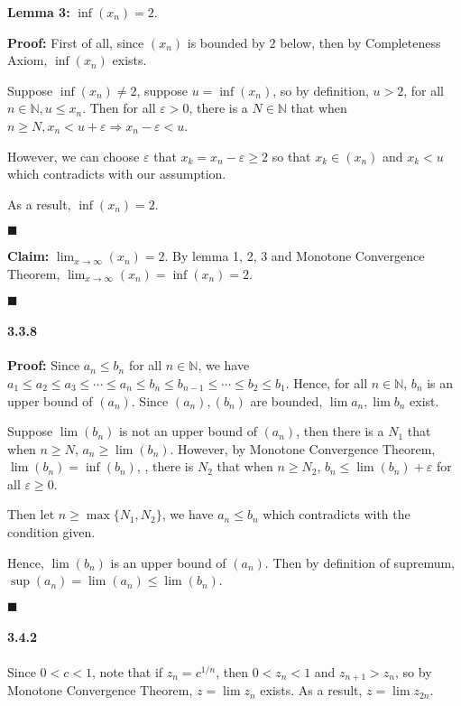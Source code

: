 \documentclass[11pt]{article}
\newcommand{\qed}{\begin{flushright}
					$\blacksquare$
				  \end{flushright}}
\begin{document}
		\textbf{Lemma 3:} $\inf(x_n) = 2$.
		
		\textbf{Proof:} First of all, since $(x_n)$ is bounded by $2$ below, then by Completeness Axiom, $\inf(x_n)$ exists.
		
		Suppose $\inf(x_n) \neq 2$, suppose $u = \inf(x_n)$, so by definition, $u > 2$, for all $n \in \mathbb{N}, u \leq x_n$. Then for all $\varepsilon > 0$, there is a $N \in \mathbb{N}$ that when $n \geq N, x_n < u + \varepsilon \Rightarrow x_n - \varepsilon < u$.
		
		However, we can choose $\varepsilon$ that $x_k = x_n - \varepsilon \geq 2$ so that $x_k \in (x_n)$ and $x_k < u$ which contradicts with our assumption.
		
		As a result, $\inf(x_n) = 2$.
		\qed
		
		\textbf{Claim:} $\lim_{x \rightarrow \infty} (x_n) = 2$.
		By lemma 1, 2, 3 and Monotone Convergence Theorem, $\lim_{x \rightarrow \infty} (x_n) = \inf(x_n) = 2$.
			\qed 
		
		
	\paragraph{3.3.8}\textbf{Proof:}
		Since $a_n \leq b_n$ for all $n \in \mathbb{N}$, we have $a_1 \leq a_2 \leq a_3 \leq \cdots \leq a_n \leq b_n \leq b_{n - 1} \leq \cdots \leq b_2 \leq b_1$. Hence, for all $n \in \mathbb{N}$, $b_n$ is an upper bound of $(a_n)$. Since $(a_n), (b_n)$ are bounded, $\lim a_n, \lim b_n$ exist.
		
		Suppose $\lim (b_n)$ is not an upper bound of $(a_n)$, then there is a $N_1$ that when $n \geq N$, $a_n \geq \lim (b_n)$. However, by Monotone Convergence Theorem, $\lim (b_n) = \inf(b_n)$, , there is $N_2$ that when $n \geq N_2$, $b_n \leq \lim (b_n) + \varepsilon$ for all $\varepsilon \geq 0$.
		
		Then let $n \geq \max\{N_1, N_2\}$, we have $a_n \leq b_n$ which contradicts with the condition given.
		
		Hence, $\lim (b_n)$ is an upper bound of $(a_n)$. Then by definition of supremum, $\sup(a_n) = \lim (a_n) \leq \lim (b_n)$.
		\qed
	\paragraph{3.4.2}
		Since $0 < c < 1$, note that if $z_n = c^{1/n}$, then $0 < z_n < 1$ and $z_{n + 1} > z_n$, so by Monotone Convergence Theorem, $z = \lim z_n$ exists. As a result, $z = \lim z_{2n}$.
		
\end{document}
